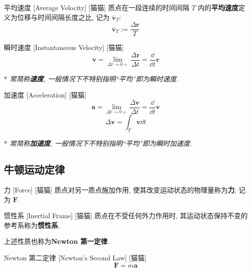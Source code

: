 \documentclass[UTF8]{ctexart}
\begin{document}
        \begin{dfn}
            []
            {平均速度}
            [Average Velocity]
            [猫猫]
            质点在一段连续的时间间隔 \(T\) 内的\textbf{平均速度}定义为位移与时间间隔长度之比, 记为 \(\bar{\bm{v}}_T\): 
            \[\bar{\bm{v}}_T:=\frac{\Delta\bm{r}}{T}\]
        \end{dfn}
        
        \begin{dfn}
            []
            {瞬时速度}
            [Instantaneous Velocity]
            [猫猫]
            \[\bm{v}=\lim_{\Delta t\to 0+}\frac{\Delta\bm{r}}{\Delta t}=\frac{\dd}{\dd t}\bm{r}\]

            * \textit{常简称\textbf{速度}, 一般情况下不特别指明``平均''即为瞬时速度. }
        \end{dfn}
        
        \begin{dfn}
            {加速度}
            [Acceleration]
            [猫猫]
            \[\bm{a}=\lim_{\Delta t\to 0+}\frac{\Delta\bm{v}}{\Delta t}=\frac{\dd}{\dd t}\bm{v}\]
            \[\Delta\bm{v}=\int_T \bm{v}\dd t\]

            * \textit{常简称\textbf{加速度}, 一般情况下不特别指明``平均''即为瞬时加速度. }
        \end{dfn}

    \subsection{牛顿运动定律}
        
        \begin{dfn}
            []
            {力}
            [Force]
            [猫猫]
            质点对另一质点施加作用, 使其改变运动状态的物理量称为\textbf{力}, 记为 \(\bm{F}\). 
        \end{dfn}
        
        \begin{dfn}
            []
            {惯性系}
            [Inertial Frame]
            [猫猫]
            质点在不受任何外力作用时, 其运动状态保持不变的参考系称为\textbf{惯性系}. 

            上述性质也称为\textbf{Newton 第一定律}. 
        \end{dfn}
        
        \begin{axm}
            []
            {Newton 第二定律}
            [Newton's Second Law]
            [猫猫]
            \[\bm{F}=m\bm{a}\]
        \end{axm}
        
\end{document}
